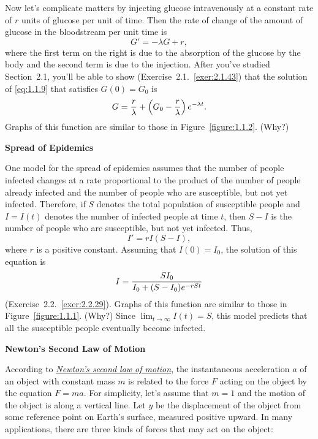 \documentclass{ximera}
\begin{document}
Now let's complicate matters by injecting glucose intravenously
at a constant rate of $r$ units of glucose per unit of time.
Then the rate of change of the amount of glucose  in the bloodstream
per unit time is
\begin{equation} \label{eq:1.1.9}
G'=-\lambda G+r,
\end{equation}
where the first term on the right is due to the absorption of the
glucose by the body and the second term is due to the injection.
 After you've studied Section~2.1,
you'll be able to show (Exercise~2.1.~\hspace*{-3pt}\ref{exer:2.1.43}) that the solution
of
\eqref{eq:1.1.9} that satisfies $G(0)=G_0$ is
$$
G={r\over\lambda}+\left(G_0-{r\over\lambda}\right)e^{-\lambda t}.
$$
Graphs of  this function are similar to those in
Figure~\ref{figure:1.1.2}.
(Why?)


\textbf{Spread of Epidemics}

\noindent
One model for the spread of epidemics assumes that the number of
people infected changes at a rate proportional to the product of the
number of people already infected and the number of people who are
susceptible, but not yet infected. Therefore, if $S$ denotes the
total population of susceptible people and $I=I(t)$ denotes the
number
of infected people at time $t$, then $S-I$ is the number of people
who are susceptible, but not yet infected. Thus,
$$
I'=rI(S-I),
$$
where $r$ is a positive constant. Assuming that $I(0)=I_0$,
the solution of this equation is
$$
I={SI_0\over I_0+(S-I_0)e^{-rSt}}
$$
(Exercise~2.2.~\hspace*{-3pt}\ref{exer:2.2.29}).
 Graphs of this function are similar to those in
Figure~\ref{figure:1.1.1}.
(Why?)
Since $\lim_{t\to\infty}I(t)=S$, this model predicts that all the
susceptible people eventually become infected.

\textbf{Newton's Second Law of Motion}

\noindent

According to
\href{http://www-history.mcs.st-and.ac.uk/Mathematicians/Newton.html}
{\color{blue}\it Newton's second law of motion},  the
instantaneous acceleration
$a$ of an object with constant mass $m$ is related to the force $F$
acting on the object by the equation $F=ma$. For simplicity, let's
assume that $m=1$ and the motion of the object is along a vertical
line. Let $y$ be the displacement of the object from some reference
point on Earth's surface, measured positive upward. In many
applications, there are three kinds of forces that may act on the
object:
\end{document}
